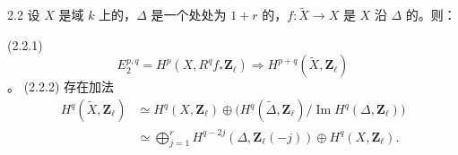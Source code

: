 \begin{SGAresult}{}{2.2}
设 $X$ 是域 $k$ 上的，$\Delta$ 是一个处处为 $1+r$ 的，$f:\widetilde X\to X$ 是 $X$ 沿 $\Delta$ 的。则：

\textup{(2.2.1)} 
\[
 E_2^{p,q}=H^p(X,R^qf_*\mathbf Z_\ell)\Longrightarrow H^{p+q}(\widetilde X,\mathbf Z_\ell)
\]
。
\textup{(2.2.2)} 存在加法
\[
\begin{aligned}
H^q(\widetilde X,\mathbf Z_\ell)&\simeq H^q(X,\mathbf Z_\ell)\oplus\bigl(H^q(\widetilde\Delta,\mathbf Z_\ell)/\operatorname{Im}H^q(\Delta,\mathbf Z_\ell)\bigr)\\
&\simeq\bigoplus_{j=1}^r H^{q-2j}(\Delta,\mathbf Z_\ell(-j))\oplus H^q(X,\mathbf Z_\ell).
\end{aligned}
\]
\end{SGAresult}
